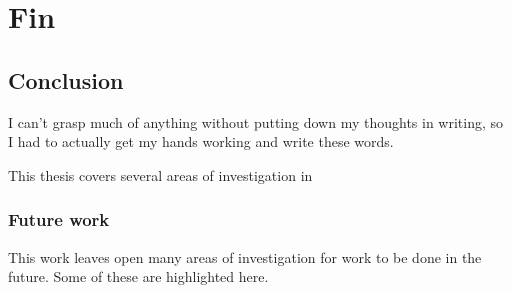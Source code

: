 
\part*{Fin}


\chapter{Conclusion}

\epigraph{
  I can't grasp much of anything without putting down my thoughts in writing, so I had to actually get my hands working and write these words.
}{\textcite{murakami2008}}


This thesis covers several areas of investigation in

\section{Future work}

This work leaves open many areas of investigation for work to be done in the future.
Some of these are highlighted here.

